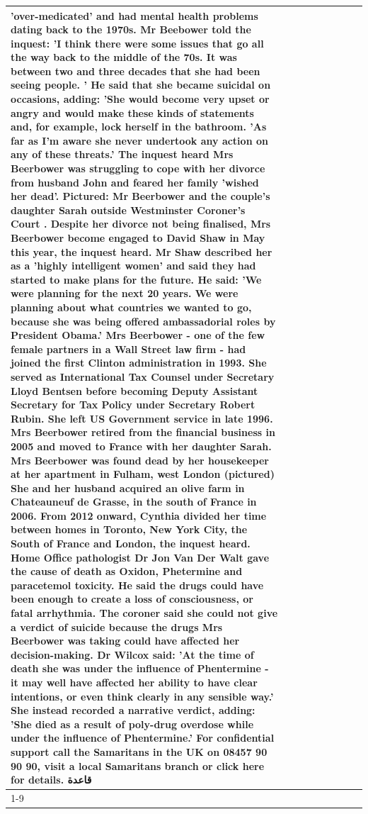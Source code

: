 \begin{table}[H]
\begin{tabular}{lllrlllll}
'over-medicated' and had mental health problems dating back to the 1970s. Mr Beebower told the inquest: 'I think there were some issues that go all the way back to the middle of the 70s. It was between two and three decades that she had been seeing people. ' He said that she became suicidal on occasions, adding: 'She would become very upset or angry and would make these kinds of statements and, for example, lock herself in the bathroom. 'As far as I'm aware she never undertook any action on any of these threats.' The inquest heard Mrs Beerbower was struggling to cope with her divorce from husband John and feared her family 'wished her dead'. Pictured: Mr Beerbower and the couple's daughter Sarah outside Westminster Coroner's Court . Despite her divorce not being finalised, Mrs Beerbower become engaged to David Shaw in May this year, the inquest heard. Mr Shaw described her as a 'highly intelligent women' and said they had started to make plans for the future. He said: 'We were planning for the next 20 years. We were planning about what countries we wanted to go, because she was being offered ambassadorial roles by President Obama.' Mrs Beerbower - one of the few female partners in a Wall Street law firm - had joined the first Clinton administration in 1993. She served as International Tax Counsel under Secretary Lloyd Bentsen before becoming Deputy Assistant Secretary for Tax Policy under Secretary Robert Rubin. She left US Government service in late 1996. Mrs Beerbower retired from the financial business in 2005 and moved to France with her daughter Sarah. Mrs Beerbower was found dead by her housekeeper at her apartment in Fulham, west London (pictured) She and her husband acquired an olive farm in Chateauneuf de Grasse, in the south of France in 2006. From 2012 onward, Cynthia divided her time between homes in Toronto, New York City, the South of France and London, the inquest heard. Home Office pathologist Dr Jon Van Der Walt gave the cause of death as Oxidon, Phetermine and paracetemol toxicity. He said the drugs could have been enough to create a loss of consciousness, or fatal arrhythmia. The coroner said she could not give a verdict of suicide because the drugs Mrs Beerbower was taking could have affected her decision-making. Dr Wilcox said: 'At the time of death she was under the influence of Phentermine - it may well have affected her ability to have clear intentions, or even think clearly in any sensible way.' She instead recorded a narrative verdict, adding: 'She died as a result of poly-drug overdose while under the influence of Phentermine.' For confidential support call the Samaritans in the UK on 08457 90 90 90, visit a local Samaritans branch or click here for details. قاعدة \\
\cline{1-9}
\bottomrule
\end{tabular}
\end{table}
